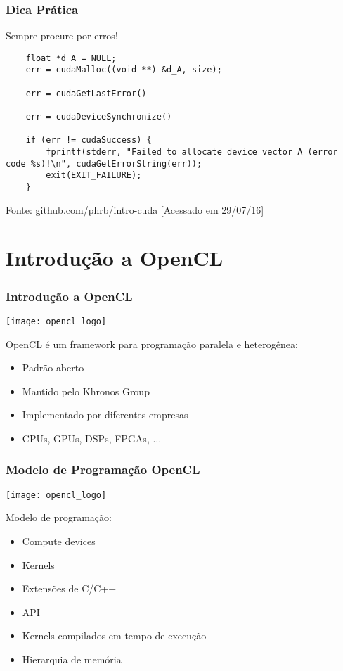 \documentclass[10pt, compress, aspectratio=43, xcolor={table,usenames,dvipsnames}]{beamer}
\begin{document}
\begin{frame}[fragile]
    \frametitle{Dica Prática}
    \alert{Sempre} procure por erros!

    \begin{verbatim}
    float *d_A = NULL;
    err = cudaMalloc((void **) &d_A, size);

    err = cudaGetLastError()

    err = cudaDeviceSynchronize()

    if (err != cudaSuccess) {
        fprintf(stderr, "Failed to allocate device vector A (error code %s)!\n", cudaGetErrorString(err));
        exit(EXIT_FAILURE);
    }
    \end{verbatim}

    \begin{center}
        \tiny{Fonte: \url{github.com/phrb/intro-cuda} [Acessado em 29/07/16]}
    \end{center}
\end{frame}

\section{Introdução a OpenCL}

\begin{frame}
    \frametitle{Introdução a OpenCL}
    \begin{center}
        \texttt{[image: opencl\_logo]}
    \end{center}
    OpenCL é um \alert{framework} para programação \alert{paralela} e
    \alert{heterogênea}:
    \begin{itemize}
        \item Padrão \alert{aberto}
        \item Mantido pelo \alert{Khronos Group}
        \item Implementado por \alert{diferentes empresas}
        \item CPUs, \alert{GPUs}, DSPs, FPGAs, $\dots$
    \end{itemize}
\end{frame}

\begin{frame}
    \frametitle{Modelo de Programação OpenCL}
    \begin{center}
        \texttt{[image: opencl\_logo]}
    \end{center}
    Modelo de programação:
    \begin{itemize}
        \item \alert{Compute devices}
        \item \alert{Kernels}
        \item Extensões de \alert{C/C++}
        \item \alert{API}
        \item Kernels compilados em \alert{tempo de execução}
        \item \alert{Hierarquia de memória}
    \end{itemize}
\end{frame}
\end{document}
